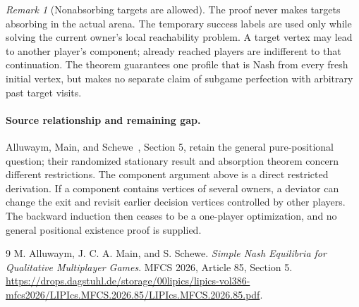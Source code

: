 \documentclass[11pt]{article}
\theoremstyle{definition}
\theoremstyle{remark}
\newtheorem{remark}{Remark}
\begin{document}
\begin{remark}[Nonabsorbing targets are allowed]
The proof never makes targets absorbing in the actual arena. The temporary success labels are used only while solving the current owner's local reachability problem. A target vertex may lead to another player's component; already reached players are indifferent to that continuation. The theorem guarantees one profile that is Nash from every fresh initial vertex, but makes no separate claim of subgame perfection with arbitrary past target visits.
\end{remark}

\paragraph{Source relationship and remaining gap.}
Alluwaym, Main, and Schewe~\cite{source}, Section 5, retain the general pure-positional question; their randomized stationary result and absorption theorem concern different restrictions. The component argument above is a direct restricted derivation. If a component contains vertices of several owners, a deviator can change the exit and revisit earlier decision vertices controlled by other players. The backward induction then ceases to be a one-player optimization, and no general positional existence proof is supplied.

\begin{thebibliography}{9}
 M. Alluwaym, J. C. A. Main, and S. Schewe.
\emph{Simple Nash Equilibria for Qualitative Multiplayer Games}. MFCS 2026, Article 85, Section 5.
\url{https://drops.dagstuhl.de/storage/00lipics/lipics-vol386-mfcs2026/LIPIcs.MFCS.2026.85/LIPIcs.MFCS.2026.85.pdf}.
\end{thebibliography}
\end{document}
